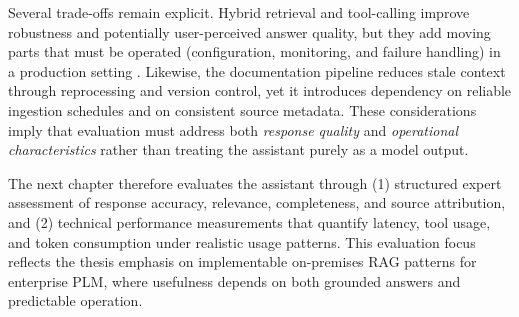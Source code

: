 Several trade-offs remain explicit. Hybrid retrieval and tool-calling improve robustness and potentially user-perceived answer quality, but they add moving parts that must be operated (configuration, monitoring, and failure handling) in a production setting \parencite{KimothiAbhinav2025ASGt}. Likewise, the documentation pipeline reduces stale context through reprocessing and version control, yet it introduces dependency on reliable ingestion schedules and on consistent source metadata. These considerations imply that evaluation must address both \emph{response quality} and \emph{operational characteristics} rather than treating the assistant purely as a model output.

The next chapter therefore evaluates the assistant through (1) structured expert assessment of response accuracy, relevance, completeness, and source attribution, and (2) technical performance measurements that quantify latency, tool usage, and token consumption under realistic usage patterns. This evaluation focus reflects the thesis emphasis on implementable on-premises RAG patterns for enterprise PLM, where usefulness depends on both grounded answers and predictable operation.

